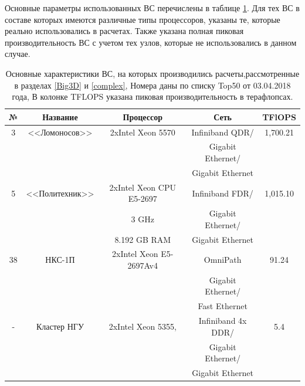 Основные параметры использованных ВС перечислены в таблице \ref{top50_2018}. Для тех ВС в составе которых имеются различные типы процессоров, указаны те, которые реально использовались в расчетах. Также указана полная пиковая производительность ВС с учетом тех узлов, которые не использовались в данном случае.

\begin{table}[ht]
\caption{
		Основные характеристики ВС, на которых производились расчеты,рассмотренные в разделах \ref{Big3D} и \ref{complex}, Номера даны по списку Top50 от 03.04.2018 года, В колонке TFLOPS указана пиковая производительность в терафлопсах.}
\begin{center}
\begin{tabular}{|c|c|c|c|c|}
\hline

№ & Название       & Процессор                & Сеть                &  TFlOPS\\
\hline 
3 & <<Ломоносов>>  &  2xIntel Xeon 5570       &  Infiniband QDR/   &   1,700.21 \\
  &                &                          &  Gigabit Ethernet/ &            \\
  &                &                          &  Gigabit Ethernet  &            \\ \hline
   
5 & <<Политехник>> & 2xIntel Xeon CPU E5-2697 &  Infiniband FDR/   &   1,015.10 \\
  &                & 3 GHz                    &  Gigabit Ethernet/ &            \\
  &                & 8.192 GB RAM             &  Gigabit Ethernet  &            \\ \hline
  
38& НКС-1П         & 2xIntel Xeon E5-2697Av4  & OmniPath           & 91.24      \\
  &                 &                          & Gigabit Ethernet/  &            \\
  &                 &                          & Fast Ethernet      &            \\ \hline
                   
- & Кластер НГУ    & 2xIntel Xeon 5355,       &  Infiniband 4x DDR/& 5.4 \\ 
  &			       &                          &   Gigabit Ethernet/&  \\
  &			       &                          &   Gigabit Ethernet &  \\ \hline                    
                   
\end{tabular}
\end{center}
\label{top50_2018}
\end{table}


